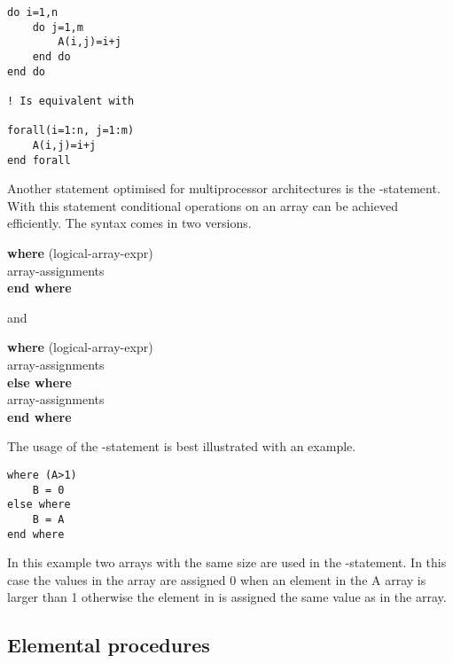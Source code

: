 \begin{lstlisting}[texcl,escapechar=\%]
do i=1,n
    do j=1,m
        A(i,j)=i+j
    end do
end do

! Is equivalent with

forall(i=1:n, j=1:m)
    A(i,j)=i+j
end forall
\end{lstlisting}

Another statement optimised for multiprocessor architectures is the -statement. With this statement conditional operations on an array can be achieved efficiently. The syntax comes in two versions.

\begin{fsyntax}
\textbf{where} (logical-array-expr)\\
\ftab array-assignments\\
\textbf{end where}
\end{fsyntax}

and

\begin{fsyntax}
\textbf{where} (logical-array-expr)\\
\ftab array-assignments\\
\textbf{else where}\\
\ftab array-assignments\\
\textbf{end where}
\end{fsyntax}

The usage of the -statement is best illustrated with an example.

\begin{lstlisting}
where (A>1)
    B = 0
else where
    B = A
end where
\end{lstlisting}

In this example two arrays with the same size are used in the -statement. In this case the values in the  array are assigned 0 when an element in the A array is larger than 1 otherwise the element in  is assigned the same value as in the  array.


\subsection{Elemental procedures}


